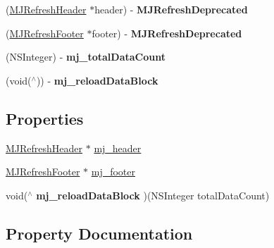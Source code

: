 \begin{DoxyCompactItemize}
\mbox{\label{category_u_i_scroll_view_07_m_j_refresh_08_a405b59158f276844f3e4456f4666b4ed}} 
(\mbox{\hyperlink{interface_m_j_refresh_header}{M\+J\+Refresh\+Header}} $\ast$header) -\/ {\bfseries M\+J\+Refresh\+Deprecated}
\item 
\mbox{\label{category_u_i_scroll_view_07_m_j_refresh_08_a206684c888f4eeda992ce51a72c47791}} 
(\mbox{\hyperlink{interface_m_j_refresh_footer}{M\+J\+Refresh\+Footer}} $\ast$footer) -\/ {\bfseries M\+J\+Refresh\+Deprecated}
\item 
\mbox{\label{category_u_i_scroll_view_07_m_j_refresh_08_a3c8d9bd01ad7529fad9a8604baf0b0c8}} 
(N\+S\+Integer) -\/ {\bfseries mj\+\_\+total\+Data\+Count}
\item 
\mbox{\label{category_u_i_scroll_view_07_m_j_refresh_08_aaeebaf16ece9a8803d541e67ba204975}} 
(void($^\wedge$)) -\/ {\bfseries mj\+\_\+reload\+Data\+Block}
\end{DoxyCompactItemize}
\subsection*{Properties}
\begin{DoxyCompactItemize}
\item 
\mbox{\hyperlink{interface_m_j_refresh_header}{M\+J\+Refresh\+Header}} $\ast$ \mbox{\hyperlink{category_u_i_scroll_view_07_m_j_refresh_08_a19fea60be0ddae15a33c3c3b283c17be}{mj\+\_\+header}}
\item 
\mbox{\hyperlink{interface_m_j_refresh_footer}{M\+J\+Refresh\+Footer}} $\ast$ \mbox{\hyperlink{category_u_i_scroll_view_07_m_j_refresh_08_a13a1e8efb797b5181ac793ad2a8a784f}{mj\+\_\+footer}}
\item 
\mbox{\label{category_u_i_scroll_view_07_m_j_refresh_08_accdb62b7a4e208252f4a82ed00e77eb1}} 
void($^\wedge$ {\bfseries mj\+\_\+reload\+Data\+Block} )(N\+S\+Integer total\+Data\+Count)
\end{DoxyCompactItemize}


\subsection{Property Documentation}
\mbox{\label{category_u_i_scroll_view_07_m_j_refresh_08_a13a1e8efb797b5181ac793ad2a8a784f}} 
